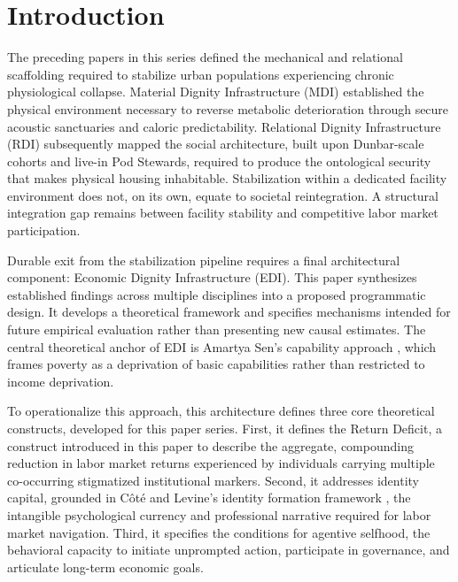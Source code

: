 \documentclass[12pt, letterpaper]{article}
\begin{document}
\newpage
\vspace{12pt}
\begingroup
{}
\setlength{\cftbeforesecskip}{2pt}
\setlength{\cftbeforesubsecskip}{-2pt}
\tableofcontents
\endgroup

\section{Introduction}

The preceding papers in this series defined the mechanical and relational scaffolding required to stabilize urban populations experiencing chronic physiological collapse. Material Dignity Infrastructure (MDI) established the physical environment necessary to reverse metabolic deterioration through secure acoustic sanctuaries and caloric predictability. Relational Dignity Infrastructure (RDI) subsequently mapped the social architecture, built upon Dunbar-scale cohorts and live-in Pod Stewards, required to produce the ontological security that makes physical housing inhabitable. Stabilization within a dedicated facility environment does not, on its own, equate to societal reintegration. A structural integration gap remains between facility stability and competitive labor market participation.

Durable exit from the stabilization pipeline requires a final architectural component: Economic Dignity Infrastructure (EDI). This paper synthesizes established findings across multiple disciplines into a proposed programmatic design. It develops a theoretical framework and specifies mechanisms intended for future empirical evaluation rather than presenting new causal estimates. The central theoretical anchor of EDI is Amartya Sen's capability approach \cite{sen1999development}, which frames poverty as a deprivation of basic capabilities rather than restricted to income deprivation.

To operationalize this approach, this architecture defines three core theoretical constructs, developed for this paper series. First, it defines the Return Deficit, a construct introduced in this paper to describe the aggregate, compounding reduction in labor market returns experienced by individuals carrying multiple co-occurring stigmatized institutional markers. Second, it addresses identity capital, grounded in C\^{o}t\'{e} and Levine's identity formation framework \cite{cote2002identity}, the intangible psychological currency and professional narrative required for labor market navigation. Third, it specifies the conditions for agentive selfhood, the behavioral capacity to initiate unprompted action, participate in governance, and articulate long-term economic goals.
\end{document}
